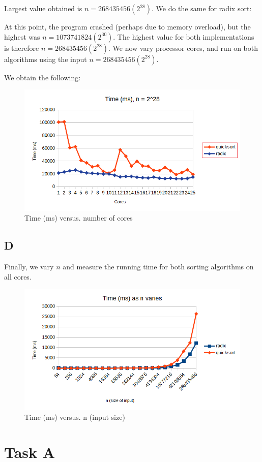 \documentclass[a4paper]{article}
\begin{document}
Largest value obtained is $n = 268435456  (2^{28})$. We do the same for radix sort:

    
At this point, the program crashed (perhaps due to memory overload), but the highest was $n =  1073741824 (2^{30})$. The highest value for both implementations is therefore $n = 268435456  (2^{28})$.
We now vary processor cores, and run on both algorithms using the input $n = 268435456  (2^{28})$.

We obtain the following: 

    \begin{figure}[H]
    \centering
    \includegraphics{graph2.png}
    \centering
    \caption{Time (ms) versus. number of cores}
\end{figure} 

\subsection*{D}

Finally, we vary $n$ and measure the running time for both sorting algorithms on all cores. 

   \begin{figure}[H]
    \centering
    \includegraphics{graph3.png}
    \centering
    \caption{Time (ms) versus. n (input size)}
\end{figure} 

\section*{Task A}
\end{document}

